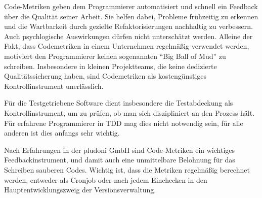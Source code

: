  Code-Metriken geben dem Programmierer automatisiert und schnell ein Feedback über die Qualität seiner Arbeit. Sie helfen dabei, Probleme frühzeitig zu erkennen und die Wartbarkeit durch gezielte Refaktorisierungen nachhaltig zu verbessern. Auch psychlogische Auswirkungen dürfen nicht unterschätzt werden. Alleine der Fakt, dass Codemetriken in einem Unternehmen regelmäßig verwendet werden, motiviert den Programmierer keinen sogenannten "`Big Ball of Mud"' zu schreiben. Insbesondere in kleinen Projektteams, die keine dedizierte Qualitätssicherung haben, sind Codemetriken als kostengünstiges Kontrollinstrument unerlässlich.
 
 Für die Testgetriebene Software dient insbesondere die Testabdeckung als Kontrollinstrument, um zu prüfen, ob man sich diszipliniert an den Prozess hält. Für erfahrene Programmierer in TDD mag dies nicht notwendig sein, für alle anderen ist dies anfangs sehr wichtig.
 
 Nach Erfahrungen in der pludoni GmbH sind Code-Metriken ein wichtiges Feedbackinstrument, und damit auch eine unmittelbare Belohnung für das Schreiben sauberen Codes. Wichtig ist, dass die Metriken regelmäßig berechnet werden, entweder als Cronjob oder nach jedem Einchecken in den Hauptentwicklungszweig der Versionsverwaltung.